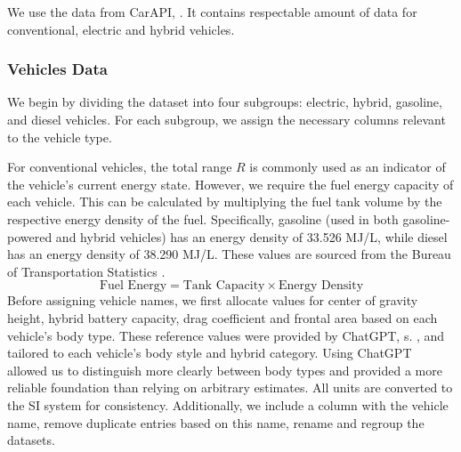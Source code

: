 We use the data from CarAPI, \cite{CarAPI}. It contains respectable amount of data for conventional, electric and hybrid vehicles. 
\subsubsection*{Vehicles Data}
	We begin by dividing the dataset into four subgroups: electric, hybrid, gasoline, and diesel vehicles. For each subgroup, we assign the necessary columns relevant to the vehicle type. 

	For conventional vehicles, the total range $R$ is commonly used as an indicator of the vehicle’s current energy state. However, we require the fuel energy capacity of each vehicle. This can be calculated by multiplying the fuel tank volume by the respective energy density of the fuel. Specifically, gasoline (used in both gasoline-powered and hybrid vehicles) has an energy density of 33.526 MJ/L, while diesel has an energy density of 38.290 MJ/L. These values are sourced from the Bureau of Transportation Statistics \cite{TranspStat}.
	\begin{equation*}
		\text{Fuel Energy}= \text{Tank Capacity} \times \text{Energy Density}
	\end{equation*}
	Before assigning vehicle names, we first allocate values for center of gravity height, hybrid battery capacity, drag coefficient and frontal area based on each vehicle’s body type. These reference values were provided by ChatGPT, s. \cite{ChatGPT}, and tailored to each vehicle's body style and hybrid category.  Using ChatGPT allowed us to distinguish more clearly between body types and provided a more reliable foundation than relying on arbitrary estimates. All units are converted to the SI system for consistency. Additionally, we include a column with the vehicle name, remove duplicate entries based on this name, rename and regroup the datasets.
